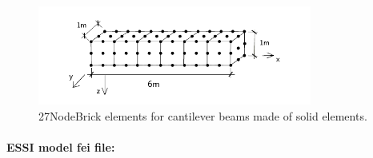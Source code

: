 \begin{figure}[!htb]
  \centering
  \includegraphics[width=9cm]{./Figure-files/_Chapter_Appendix_Illustrative_Examples/beam_27brick_6div.pdf}
  \caption{27NodeBrick elements for cantilever beams made of solid elements.}
  \label{fig 27NodeBrick elements for cantilever beams of different Poisson's ratios}
\end{figure}

\paragraph{ESSI model fei file: } ~


